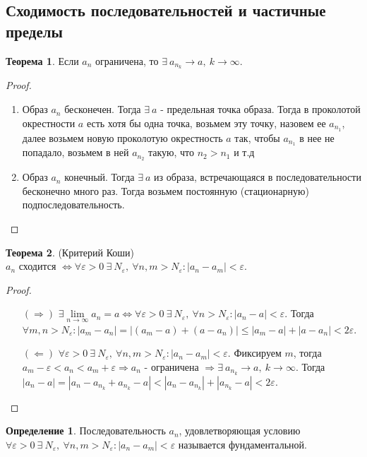 \documentclass[a4paper, 12pt]{article}
\renewcommand{\epsilon}{\varepsilon}
\newcommand{\lra}{\Leftrightarrow}
\newcommand\tab[1][.5cm]{\hspace*{#1}}
\newcommand{\lims}{\lim\limits_{n\to \infty}}
\theoremstyle{definition}
\newtheorem*{definition}{Определение}
\newtheorem*{theorem}{Теорема}
\begin{document}
        \subsection{Сходимость последовательностей и частичные пределы}
        \begin{theorem}
            Если $a_n$ ограничена, то $\exists\ a_{n_k}\to a,\ k\to \infty$. 
        \end{theorem}
        \begin{proof}\tab
            \begin{enumerate}
                \item Образ $a_n$ бесконечен. Тогда $\exists\ a$ - предельная точка образа. Тогда в проколотой окрестности $a$ есть хотя бы одна точка, возьмем эту точку, назовем ее $a_{n_1}$, далее возьмем новую проколотую окрестность $a$ так, чтобы $a_{n_1}$ в нее не попадало, возьмем в ней $a_{n_2}$ такую, что $n_2>n_1$ и т.д
                \item Образ $a_n$ конечный. Тогда $\exists\ a$ из образа, встречающаяся в последовательности бесконечно много раз. Тогда возьмем постоянную (стационарную) подпоследовательность.
            \end{enumerate}
        \end{proof} 
        \begin{theorem} (Критерий Коши)\\
            $a_n$ сходится $\lra \forall \epsilon>0\ \exists\ N_{\epsilon},\ \forall n,m>N_{\epsilon}: |a_n-a_m|<\epsilon$.
        \end{theorem} 
        \begin{proof}\tab
            \begin{itemize}
                \item[$(\Rightarrow)$] $\exists \lims a_n =a \lra \forall \epsilon>0\ \exists\ N_{\epsilon},\ \forall n>N_{\epsilon}: |a_n-a|<\epsilon$. Тогда $\forall m,n>N_{\epsilon}: |a_m-a_n|=|(a_m-a)+(a-a_n)|\leq |a_m-a|+|a-a_n|<2\epsilon$. 
                \item[$(\Leftarrow)$] $\forall \epsilon>0\ \exists\ N_{\epsilon},\ \forall n,m>N_{\epsilon}: |a_n-a_m|<\epsilon$. Фиксируем $m$, тогда\\ $a_m-\epsilon<a_n<a_m+\epsilon \Rightarrow a_n$ - ограничена $\Rightarrow \exists\ a_{n_k}\to a,\ k\to \infty$. Тогда $|a_n-a|=|a_n-a_{n_k}+a_{n_k}-a|<|a_n-a_{n_k}|+|a_{n_k}-a|<2\epsilon$. 
            \end{itemize}
        \end{proof} 
        \begin{definition}
            Последовательность $a_n$, удовлетворяющая условию\\ $\forall \epsilon>0\ \exists\ N_{\epsilon},\ \forall n,m>N_{\epsilon}: |a_n-a_m|<\epsilon$ называется фундаментальной.
        \end{definition} 
\end{document}
